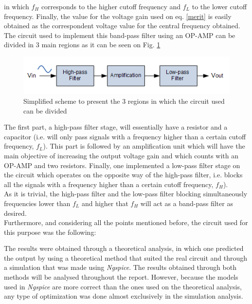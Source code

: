 in which $f_H$ corresponds to the higher cutoff frequency and $f_L$ to the lower cutoff frequency. Finally, the value for the voltage gain used on eq. \eqref{merit} is easily obtained as the correspondent voltage value for the central frequency obtained. \\

The circuit used to implement this band-pass filter using an OP-AMP can be divided in 3 main regions as it can be seen on Fig. \ref{initialscheme}

\begin{figure}[H]
    \centering
    \includegraphics{esquemabunituh.PNG}
    \caption{Simplified scheme to present the 3 regions in which the circuit used can be divided}
    \label{initialscheme}
\end{figure}

The first part, a high-pass filter stage, will essentially have a resistor and a capacitor (i.e. will only pass signals with a frequency higher than a certain cutoff frequency, $f_L$). This part is followed by an amplification unit which will have the main objective of increasing the output voltage gain and which counts with an OP-AMP and two resistors. Finally, one implemented a low-pass filter stage on the circuit which operates on the opposite way of the high-pass filter, i.e. blocks all the signals with a frequency higher than a certain cutoff frequency, $f_H$). \\

As it is trivial, the high-pass filter and the low-pass filter blocking simultaneously frequencies lower than $f_L$ and higher that $f_H$ will act as a band-pass filter as desired. \\

Furthermore, and considering all the points mentioned before, the circuit used for this purpose was the following:


The results were obtained through a theoretical analysis, in which one predicted the output by using a theoretical method that suited the real circuit and through a simulation that was made using \textit{Ngspice}. The results obtained through both methods will be analysed throughout the report. However, because the models used in \textit{Ngspice} are more correct than the ones used on the theoretical analysis, any type of optimization was done almost exclusively in the simulation analysis.\\